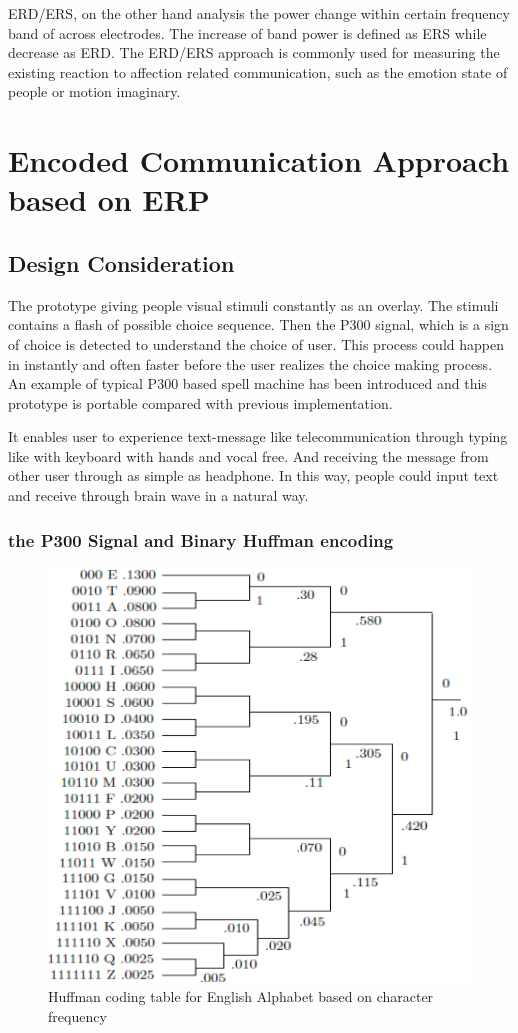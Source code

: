 \documentclass[a4paper]{article}
\begin{document}
ERD/ERS, on the other hand analysis the power change within certain frequency band of across electrodes. The increase of band power is defined as ERS while decrease as ERD. The ERD/ERS approach is commonly used for measuring the existing reaction to affection related communication, such as the emotion state of people or motion imaginary.

\section{Encoded Communication Approach based on ERP}

\subsection{Design Consideration}

The prototype giving people visual stimuli constantly as an overlay. The stimuli contains a flash of possible choice sequence. Then the P300 signal, which is a sign of choice is detected to understand the choice of user. This process could happen in instantly and often faster before the user realizes the choice making process. An example of typical P300 based spell machine has been introduced and this prototype is portable compared with previous implementation. 

It enables user to experience text-message like telecommunication through typing like with keyboard with hands and vocal free. And receiving the message from other user through as simple as headphone. In this way, people could input text and receive through brain wave in a natural way.

\subsubsection{the P300 Signal and Binary Huffman encoding}

\begin{figure}
	\centering
	\includegraphics[width=0.8 \linewidth]{Huffman}
	\caption{Huffman coding table for English Alphabet based on character frequency}
	\label{fig:huff}
\end{figure}
\end{document}
